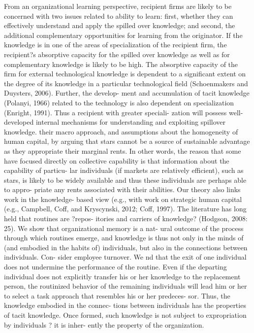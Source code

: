 \documentclass[12pt,letterpaper]{article}
\begin{document}
From an organizational learning perspective, recipient firms are likely to be concerned with two issues related to ability to learn: first, whether they can effectively understand and apply the spilled over knowledge; and second, the additional complementary opportunities for learning from the originator. If the knowledge is in one of the areas of specialization of the recipient firm, the recipient?s absorptive capacity \citep{Cohen1990} for the spilled over knowledge as well as for complementary knowledge is likely to be high. The absorptive capacity of the firm for external technological knowledge is dependent to a significant extent on the degree of its knowledge in a particular technological field (Schoenmakers and Duysters, 2006). Further, the develop- ment and accumulation of tacit knowledge (Polanyi, 1966) related to the technology is also dependent on specialization (Enright, 1991). Thus a recipient with greater speciali- zation will possess well-developed internal mechanisms for understanding and exploiting spillover knowledge.
 their macro approach, and assumptions about the homogeneity of human capital, by arguing that stars cannot be a source of sustainable advantage as they appropriate their marginal rents. In other words, the reason that some have focused directly on collective capability is that information about the capability of particu- lar individuals (if markets are relatively efficient), such as stars, is likely to be widely available and thus these individuals are perhaps able to appro- priate any rents associated with their abilities.
Our theory also links work in the knowledge- based view (e.g., \cite{Grant1996b, Kogut1992} with work on strategic human capital (e.g., Campbell, Coff, and Kryscynski, 2012; Coff, 1997). The literature has long held that routines are ?repos- itories and carriers of knowledge? (Hodgson, 2008: 25). We show that organizational memory is a nat- ural outcome of the process through which routines emerge, and knowledge is thus not only in the minds of (and embodied in the habits of) individuals, but also in the connections between individuals. Con- sider employee turnover. We  nd that the exit of one individual does not undermine the performance of the routine. Even if the departing individual does not explicitly transfer his or her knowledge to the replacement person, the routinized behavior of the remaining individuals will lead him or her to select a task approach that resembles his or her predeces- sor. Thus, the knowledge embodied in the connec- tions between individuals has the properties of tacit knowledge. Once formed, such knowledge is not subject to expropriation by individuals ? it is inher- ently the property of the organization.
\end{document}
